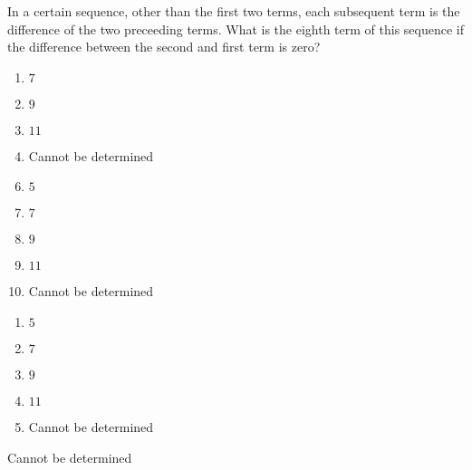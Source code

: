 






 In a certain sequence, other than the first two terms, each subsequent term is the difference of the two preceeding terms.  What is the eighth term of this sequence if the difference between the second and first term is zero?


\ifsat
	\begin{enumerate}[label=\Alph*)]
		\item $7$
		\item   $9$
		\item  $11$
		\item   Cannot be determined%
	\end{enumerate}
\else
\fi

\ifacteven
	\begin{enumerate}[label=\textbf{\Alph*.},itemsep=\fill,align=left]
		\setcounter{enumii}{5}
		\item   $5$
		\item $7$
		\item   $9$
		\addtocounter{enumii}{1}
		\item  $11$
		\item   Cannot be determined%
	\end{enumerate}
\else
\fi

\ifactodd
	\begin{enumerate}[label=\textbf{\Alph*.},itemsep=\fill,align=left]
		\item   $5$
		\item $7$
		\item   $9$
		\item  $11$
		\item   Cannot be determined%
	\end{enumerate}
\else
\fi

\ifgridin
   Cannot be determined%

\else
\fi

